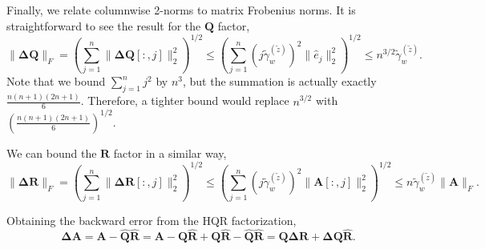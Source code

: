\documentclass[review,onefignum,onetabnum]{siamart190516}
\newcommand{\R}{\mathbb{R}}
\newcommand{\bb}[1]{\mathbf{#1}}
\begin{document}
Finally, we relate columnwise 2-norms to matrix Frobenius norms.
It is straightforward to see the result for the $\bb{Q}$ factor,
\begin{equation}
\|\bb{\Delta Q}\|_F = \left(\sum_{j=1}^n \|\bb{\Delta Q}[:,j]\|_2^2\right)^{1/2} \leq \left(\sum_{j=1}^n (j\tilde{\gamma}_w^{(\tilde{z})})^2 \|\hat{e}_j\|_2^2\right)^{1/2} \leq n^{3/2}\tilde{\gamma}_w^{(\tilde{z})}.
\end{equation}
Note that we bound $\sum_{j=1}^n j^2$ by $n^3$, but the summation is actually exactly $\frac{n(n+1)(2n+1)}{6}$. 
Therefore, a tighter bound would replace $n^{3/2}$ with $\left(\frac{n(n+1)(2n+1)}{6}\right)^{1/2}$.\par 
We can bound the $\bb{R}$ factor in a similar way,
\begin{equation}
\|\bb{\Delta R}\|_F = \left(\sum_{j=1}^n \|\bb{\Delta R}[:,j]\|_2^2\right)^{1/2} \leq \left(\sum_{j=1}^n (j\tilde{\gamma}_w^{(\tilde{z})})^2 \|\bb{A}[:,j]\|_2^2\right)^{1/2} \leq n\tilde{\gamma}_w^{(\tilde{z})} \|\bb{A}\|_F.
\end{equation}

Obtaining the backward error from the HQR factorization,
$$\bb{\Delta A}=\bb{A}-\hat{\bb{Q}}\hat{\bb{R}}
= \bb{A}-\bb{Q}\hat{\bb{R}} + \bb{Q}\hat{\bb{R}} - \hat{\bb{Q}}\hat{\bb{R}}
= \bb{Q \Delta R} + \bb{\Delta Q} \hat{\bb{R}}.$$
\end{document}
